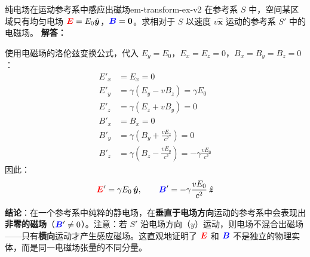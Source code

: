 \documentclass[11pt,a4paper,openany,oneside]{book}
\newcommand{\vecE}{\textcolor{red}{\vect{E}}}
\newcommand{\vecB}{\textcolor{blue}{\vect{B}}}
\newcommand{\vect}[1]{\bm{#1}}
\newcommand{\unitvec}[1]{\hat{\vect{#1}}}
\newcommand{\difficulty}[1]{\marginnote{\textcolor{red}{\textbf{[#1]}}}}
\begin{document}
\begin{example}{纯电场在运动参考系中感应出磁场}{em-transform-ex-v2}
\difficulty{提高}
在参考系 $S$ 中，空间某区域只有均匀电场 $\vecE = E_0 \unitvec{y}$，$\vecB = \vect{0}$。求相对于 $S$ 以速度 $v\unitvec{x}$ 运动的参考系 $S'$ 中的电磁场。
\tcblower
\textbf{解答：}

使用电磁场的洛伦兹变换公式，代入 $E_y = E_0$，$E_x = E_z = 0$，$B_x = B_y = B_z = 0$：
\begin{align*}
E'_x &= E_x = 0 \\
E'_y &= \gamma(E_y - vB_z) = \gamma E_0 \\
E'_z &= \gamma(E_z + vB_y) = 0 \\
B'_x &= B_x = 0 \\
B'_y &= \gamma\left(B_y + \frac{vE_z}{c^2}\right) = 0 \\
B'_z &= \gamma\left(B_z - \frac{vE_y}{c^2}\right) = -\gamma \frac{vE_0}{c^2}
\end{align*}
因此：
\[
\vecE' = \gamma E_0\,\unitvec{y}, \qquad \vecB' = -\gamma \frac{v E_0}{c^2}\,\unitvec{z}
\]

\textbf{结论}：在一个参考系中纯粹的静电场，在\textbf{垂直于电场方向}运动的参考系中会表现出\textbf{非零的磁场}（$\vecB' \neq 0$）。注意：若 $S'$ 沿电场方向（$y$）运动，则电场不混合出磁场——只有\textbf{横向}运动才产生感应磁场。这直观地证明了 $\vecE$ 和 $\vecB$ 不是独立的物理实体，而是同一电磁场张量的不同分量。
\end{example}
\end{document}
